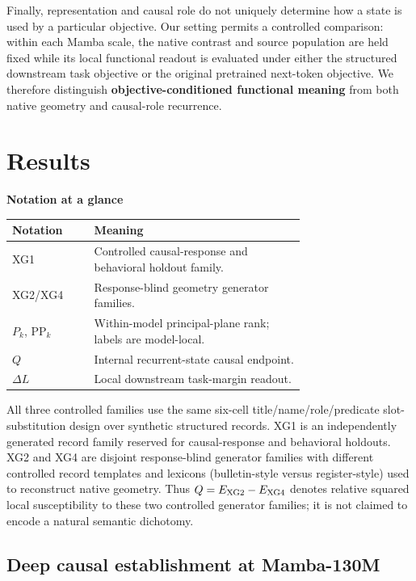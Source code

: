 \documentclass{article}
\begin{document}
Finally, representation and causal role do not uniquely determine how a state is used by a particular objective. Our setting permits a controlled comparison: within each Mamba scale, the native contrast and source population are held fixed while its local functional readout is evaluated under either the structured downstream task objective or the original pretrained next-token objective. We therefore distinguish \textbf{objective-conditioned functional meaning} from both native geometry and causal-role recurrence.

\section{Results}
\label{sec:results}

\noindent\begin{minipage}{\linewidth}
\centering\small
\textbf{Notation at a glance}\\[3pt]
\begin{tabular}{@{}lp{0.72\linewidth}@{}}
\toprule
Notation & Meaning \\
\midrule
XG1 & Controlled causal-response and behavioral holdout family. \\
XG2/XG4 & Response-blind geometry generator families. \\
$P_k$, $\mathrm{PP}_k$ & Within-model principal-plane rank; labels are model-local. \\
$Q$ & Internal recurrent-state causal endpoint. \\
$\Delta L$ & Local downstream task-margin readout. \\
\bottomrule
\end{tabular}
\end{minipage}
\par\medskip

All three controlled families use the same six-cell title/name/role/predicate slot-substitution design over synthetic structured records. XG1 is an independently generated record family reserved for causal-response and behavioral holdouts. XG2 and XG4 are disjoint response-blind generator families with different controlled record templates and lexicons (bulletin-style versus register-style) used to reconstruct native geometry. Thus $Q=E_{\rm XG2}-E_{\rm XG4}$ denotes relative squared local susceptibility to these two controlled generator families; it is not claimed to encode a natural semantic dichotomy.


\subsection{Deep causal establishment at Mamba-130M}
\label{sec:deep}
\end{document}
